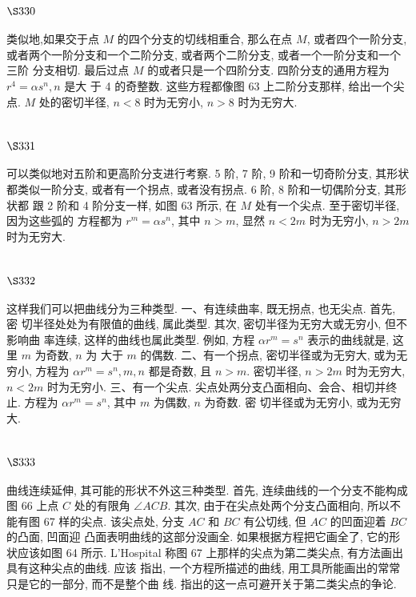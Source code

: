 \section{$\S 330$}
类似地,如果交于点 $M$ 的四个分支的切线相重合, 那么在点 $M$, 或者四个一阶分支, 或者两个一阶分支和一个二阶分支, 或者两个二阶分支, 或者一个一阶分支和一个三阶 分支相切. 最后过点 $M$ 的或者只是一个四阶分支. 四阶分支的通用方程为 $r^{4}=\alpha s^{n}, n$ 是大 于 4 的奇整数. 这些方程都像图 63 上二阶分支那样, 给出一个尖点. $M$ 处的密切半径, $n<8$ 时为无穷小, $n>8$ 时为无穷大.

\section{$\S 331$}

可以类似地对五阶和更高阶分支进行考察. 5 阶, 7 阶, 9 阶和一切奇阶分支, 其形状 都类似一阶分支, 或者有一个拐点, 或者没有拐点. 6 阶, 8 阶和一切偶阶分支, 其形状都 跟 2 阶和 4 阶分支一样, 如图 63 所示, 在 $M$ 处有一个尖点. 至于密切半径, 因为这些弧的 方程都为 $r^{m}=\alpha s^{n}$, 其中 $n>m$, 显然 $n<2 m$ 时为无穷小, $n>2 m$ 时为无穷大.

\section{$\S 332$}

这样我们可以把曲线分为三种类型. 一、有连续曲率, 既无拐点, 也无尖点. 首先, 密 切半径处处为有限值的曲线, 属此类型. 其次, 密切半径为无穷大或无穷小, 但不影响曲 率连续, 这样的曲线也属此类型. 例如, 方程 $\alpha r^{m}=s^{n}$ 表示的曲线就是, 这里 $m$ 为奇数, $n$ 为 大于 $m$ 的偶数. 二、有一个拐点, 密切半径或为无穷大, 或为无穷小, 方程为 $\alpha r^{m}=s^{n}, m, n$ 都是奇数, 且 $n>m$. 密切半径, $n>2 m$ 时为无穷大, $n<2 m$ 时为无穷小. 三、有一个尖点. 尖点处两分支凸面相向、会合、相切并终止. 方程为 $\alpha r^{m}=s^{n}$, 其中 $m$ 为偶数, $n$ 为奇数. 密 切半径或为无穷小, 或为无穷大.

\section{$\S 333$}

曲线连续延伸, 其可能的形状不外这三种类型. 首先, 连续曲线的一个分支不能构成 图 66 上点 $C$ 处的有限角 $\angle A C B$. 其次, 由于在尖点处两个分支凸面相向, 所以不能有图 67 样的尖点. 该尖点处, 分支 $A C$ 和 $B C$ 有公切线, 但 $A C$ 的凹面迎着 $B C$ 的凸面, 凹面迎 凸面表明曲线的这部分没画全. 如果根据方程把它画全了, 它的形状应该如图 64 所示. L'Hospital 称图 67 上那样的尖点为第二类尖点, 有方法画出具有这种尖点的曲线. 应该 指出, 一个方程所描述的曲线, 用工具所能画出的常常只是它的一部分, 而不是整个曲 线. 指出的这一点可避开关于第二类尖点的争论. 


